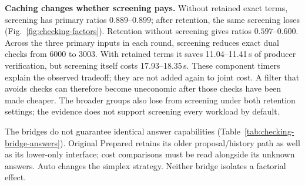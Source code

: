 \textbf{Caching changes whether screening pays.} Without retained exact terms, screening has primary ratios $0.889$--$0.899$; after retention, the same screening loses (Fig.~\ref{fig:checking-factors}). Retention without screening gives ratios $0.597$--$0.600$. Across the three primary inputs in each round, screening reduces exact dual checks from 6000 to 3003. With retained terms it saves 11.04--11.41\,s of producer verification, but screening itself costs 17.93--18.35\,s. These component timers explain the observed tradeoff; they are not added again to joint cost. A filter that avoids checks can therefore become uneconomic after those checks have been made cheaper. The broader groups also lose from screening under both retention settings; the evidence does not support screening every workload by default.

The bridges do not guarantee identical answer capabilities (Table~\ref{tab:checking-bridge-answers}). Original Prepared retains its older proposal/history path as well as its lower-only interface; cost comparisons must be read alongside its unknown answers. Auto changes the simplex strategy. Neither bridge isolates a factorial effect.
